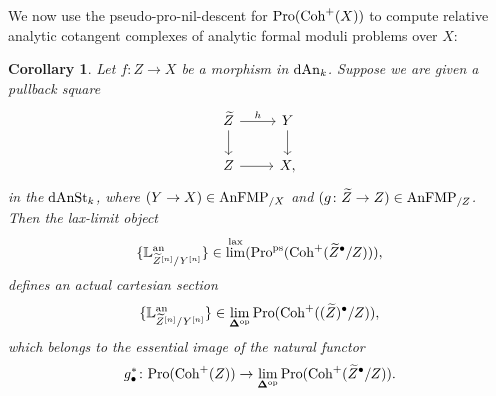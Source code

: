 \documentclass[10pt,a4paper,reqno]{amsart} %
\theoremstyle{plain}
\newtheorem{cor}[thm]{Corollary}
\theoremstyle{definition}
\theoremstyle{remark}
\numberwithin{equation}{section}
\begin{document}
We now use the pseudo-pro-nil-descent for $\mathrm{Pro}(\mathrm{Coh}^+(X))$ to compute relative analytic cotangent complexes of
analytic formal moduli problems over $X$:

\begin{cor} \label{cor:analytic_relative_cotangent_complex_defines_cartesian_sections_in_the_totalization}
    Let $f \colon Z \to X$ be a morphism in $\mathrm{dAn}_k$. Suppose we are given a pullback square
        \[
        \begin{tikzcd}
            \tZ \ar{r}{h} \ar{d} & Y \ar{d} \\
            Z \ar{r} & X,
        \end{tikzcd}
        \]
    in the \infcat $\mathrm{dAnSt}_k$, where $( Y \to X) \in \mathrm{AnFMP}_{/X}$ and $(g \colon\widetilde Z \to Z) \in \mathrm{AnFMP}_{/Z}$. Then the lax-limit object
        \[
            \{ \mathbb L^\mathrm{an}_{\widetilde Z^{[n]} / Y^{[n]}} \} \in \lim^\mathrm{lax}(\mathrm{Pro}^\mathrm{ps}(\mathrm{Coh}^+(\widetilde Z^\bullet/Z))),  
        \]
    defines an actual cartesian section
        \[
            \{ \mathbb L^\mathrm{an}_{\widetilde Z^{[n]}/ Y^{[n]}} \} \in \lim_{\bm{\Delta} ^\mathrm{op}}\mathrm{Pro}(\mathrm{Coh}^+((\widetilde Z)^\bullet /Z)),
        \]
    which belongs to the essential image of the natural functor
        \[
            g^*_\bullet \colon \mathrm{Pro}(\mathrm{Coh}^+(Z)) \to \lim_{\bm{\Delta} ^\mathrm{op}}\mathrm{Pro}(\mathrm{Coh}^+(\widetilde Z^\bullet / Z)).
        \]
\end{cor}
\end{document}
